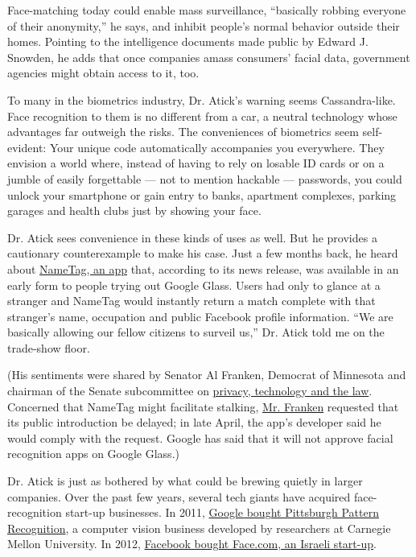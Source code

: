 Face-matching today could enable mass surveillance, ``basically robbing
everyone of their anonymity,'' he says, and inhibit people's normal
behavior outside their homes. Pointing to the intelligence documents
made public by Edward J. Snowden, he adds that once companies amass
consumers' facial data, government agencies might obtain access to it,
too.

To many in the biometrics industry, Dr. Atick's warning seems
Cassandra-like. Face recognition to them is no different from a car, a
neutral technology whose advantages far outweigh the risks. The
conveniences of biometrics seem self-evident: Your unique code
automatically accompanies you everywhere. They envision a world where,
instead of having to rely on losable ID cards or on a jumble of easily
forgettable --- not to mention hackable --- passwords, you could unlock
your smartphone or gain entry to banks, apartment complexes, parking
garages and health clubs just by showing your face.

Dr. Atick sees convenience in these kinds of uses as well. But he
provides a cautionary counterexample to make his case. Just a few months
back, he heard about \href{http://www.nametag.ws/\#mainscreen}{NameTag,
an app} that, according to its news release, was available in an early
form to people trying out Google Glass. Users had only to glance at a
stranger and NameTag would instantly return a match complete with that
stranger's name, occupation and public Facebook profile information.
``We are basically allowing our fellow citizens to surveil us,'' Dr.
Atick told me on the trade-show floor.

(His sentiments were shared by Senator Al Franken, Democrat of Minnesota
and chairman of the Senate subcommittee on
\href{http://www.judiciary.senate.gov/about/subcommittees\#privacy}{privacy,
technology and the law}. Concerned that NameTag might facilitate
stalking,
\href{http://www.franken.senate.gov/?p=press_release\&id=2699}{Mr.
Franken} requested that its public introduction be delayed; in late
April, the app's developer said he would comply with the request. Google
has said that it will not approve facial recognition apps on Google
Glass.)

Dr. Atick is just as bothered by what could be brewing quietly in larger
companies. Over the past few years, several tech giants have acquired
face-recognition start-up businesses. In 2011,
\href{http://blogs.wsj.com/digits/2011/07/22/google-acquires-facial-recognition-technology-company/}{Google
bought Pittsburgh Pattern Recognition}, a computer vision business
developed by researchers at Carnegie Mellon University. In 2012,
\href{http://www.bloomberg.com/news/2012-06-18/facebook-buys-face-com-adds-facial-recognition-software.html}{Facebook
bought Face.com, an Israeli start-up}.

